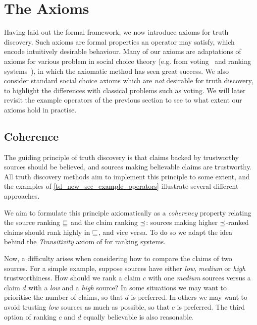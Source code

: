 

\section{The Axioms}

Having laid out the formal framework, we now introduce axioms for truth
discovery. Such axioms are formal properties an operator may satisfy, which
encode intuitively desirable behaviour. Many of our axioms are adaptations of
axioms for various problem in social choice theory (e.g. from
voting~\cite{zwicker2016voting} and ranking systems~\cite{altman2008}), in
which the axiomatic method has seen great success. We also consider standard
social choice axioms which are \emph{not} desirable for truth discovery, to
highlight the differences with classical problems such as voting. We will later
revisit the example operators of the previous section to see to what extent our
axioms hold in practise.

\subsection{Coherence}

The guiding principle of truth discovery is that claims backed by trustworthy
sources should be believed, and sources making believable claims are
trustworthy. All truth discovery methods aim to implement this principle to
some extent, and the examples of \cref{td_new_sec_example_operators} illustrate
several different approaches.

We aim to formulate this principle axiomatically as a \emph{coherency} property
relating the source ranking $\sqsubseteq$ and the claim ranking $\preceq$: sources making
higher $\preceq$-ranked claims should rank highly in $\sqsubseteq$, and vice versa. To do
so we adapt the idea behind the \emph{Transitivity} axiom of
\textcite{altman2008} for ranking systems.

Now, a difficulty arises when considering how to compare the claims of two
sources. For a simple example, suppose sources have either \emph{low},
\emph{medium} or \emph{high} trustworthiness. How should we rank a claim $c$
with one \emph{medium} sources versus a claim $d$ with a \emph{low} and a
\emph{high} source? In some situations we may want to prioritise the number of
claims, so that $d$ is preferred. In others we may want to avoid trusting
\emph{low} sources as much as possible, so that $c$ is preferred. The third
option of ranking $c$ and $d$ equally believable is also reasonable.

